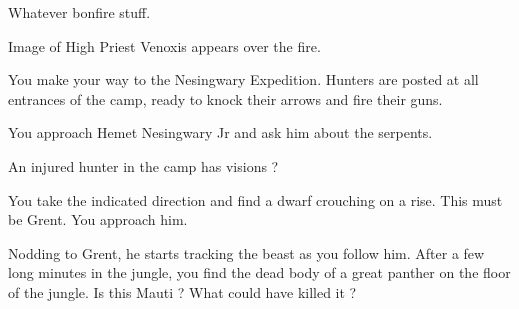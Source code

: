 

Whatever bonfire stuff.


Image of High Priest Venoxis appears over the fire.







You make your way to the Nesingwary Expedition. Hunters are posted at all entrances of the camp, ready to knock their arrows and fire their guns.


You approach Hemet Nesingwary Jr and ask him about the serpents.


An injured hunter in the camp has visions ?



You take the indicated direction and find a dwarf crouching on a rise. This must be Grent. You approach him.




Nodding to Grent, he starts tracking the beast as you follow him. After a few long minutes in the jungle, you find the dead body of a great panther on the floor of the jungle. Is this Mauti ? What could have killed it ?

